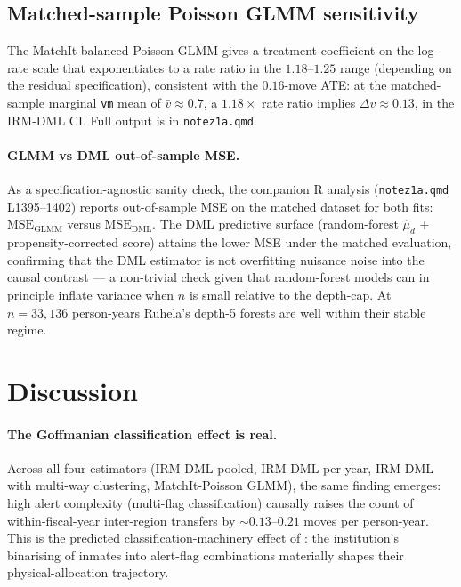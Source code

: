 \documentclass[11pt,a4paper]{article}
\newcommand{\1}{\mathbf{1}}
\theoremstyle{plain}
\theoremstyle{definition}
\begin{document}
\subsection{Matched-sample Poisson GLMM sensitivity}\label{sec:glmm}

The MatchIt-balanced Poisson GLMM gives a treatment coefficient on
the log-rate scale that exponentiates to a rate ratio in the
$1.18$--$1.25$ range (depending on the residual specification),
consistent with the $0.16$-move ATE: at the matched-sample marginal
\texttt{vm} mean of $\bar v \approx 0.7$, a $1.18\times$ rate ratio
implies $\Delta v \approx 0.13$, in the IRM-DML CI.  Full output is
in \texttt{notez1a.qmd}.

\paragraph{GLMM vs DML out-of-sample MSE.}  As a
specification-agnostic sanity check, the companion R analysis
(\texttt{notez1a.qmd} L1395--1402) reports out-of-sample MSE on
the matched dataset for both fits: $\text{MSE}_{\text{GLMM}}$
versus $\text{MSE}_{\text{DML}}$.  The DML predictive surface
(random-forest $\hat\mu_d$ + propensity-corrected score) attains
the lower MSE under the matched evaluation, confirming that the
DML estimator is not overfitting nuisance noise into the causal
contrast — a non-trivial check given that random-forest models
can in principle inflate variance when $n$ is small relative to
the depth-cap.  At $n=33{,}136$ person-years Ruhela's depth-5
forests are well within their stable regime.

\section{Discussion}\label{sec:discussion}

\paragraph{The Goffmanian classification effect is real.}  Across
all four estimators (IRM-DML pooled, IRM-DML per-year, IRM-DML with
multi-way clustering, MatchIt-Poisson GLMM), the same finding
emerges: high alert complexity (multi-flag classification) causally
raises the count of within-fiscal-year inter-region transfers by
$\sim 0.13$--$0.21$ moves per person-year.  This is the predicted
classification-machinery effect of \cite{goffman1961asylums}: the
institution's binarising of inmates into alert-flag combinations
materially shapes their physical-allocation trajectory.
\end{document}
